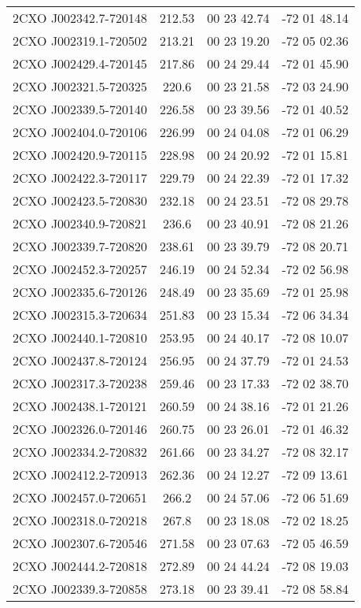 \begin{table}
\begin{tabular}{cccc}
2CXO J002342.7-720148 & 212.53 & 00 23 42.74 & -72 01 48.14 \\
2CXO J002319.1-720502 & 213.21 & 00 23 19.20 & -72 05 02.36 \\
2CXO J002429.4-720145 & 217.86 & 00 24 29.44 & -72 01 45.90 \\
2CXO J002321.5-720325 & 220.6 & 00 23 21.58 & -72 03 24.90 \\
2CXO J002339.5-720140 & 226.58 & 00 23 39.56 & -72 01 40.52 \\
2CXO J002404.0-720106 & 226.99 & 00 24 04.08 & -72 01 06.29 \\
2CXO J002420.9-720115 & 228.98 & 00 24 20.92 & -72 01 15.81 \\
2CXO J002422.3-720117 & 229.79 & 00 24 22.39 & -72 01 17.32 \\
2CXO J002423.5-720830 & 232.18 & 00 24 23.51 & -72 08 29.78 \\
2CXO J002340.9-720821 & 236.6 & 00 23 40.91 & -72 08 21.26 \\
2CXO J002339.7-720820 & 238.61 & 00 23 39.79 & -72 08 20.71 \\
2CXO J002452.3-720257 & 246.19 & 00 24 52.34 & -72 02 56.98 \\
2CXO J002335.6-720126 & 248.49 & 00 23 35.69 & -72 01 25.98 \\
2CXO J002315.3-720634 & 251.83 & 00 23 15.34 & -72 06 34.34 \\
2CXO J002440.1-720810 & 253.95 & 00 24 40.17 & -72 08 10.07 \\
2CXO J002437.8-720124 & 256.95 & 00 24 37.79 & -72 01 24.53 \\
2CXO J002317.3-720238 & 259.46 & 00 23 17.33 & -72 02 38.70 \\
2CXO J002438.1-720121 & 260.59 & 00 24 38.16 & -72 01 21.26 \\
2CXO J002326.0-720146 & 260.75 & 00 23 26.01 & -72 01 46.32 \\
2CXO J002334.2-720832 & 261.66 & 00 23 34.27 & -72 08 32.17 \\
2CXO J002412.2-720913 & 262.36 & 00 24 12.27 & -72 09 13.61 \\
2CXO J002457.0-720651 & 266.2 & 00 24 57.06 & -72 06 51.69 \\
2CXO J002318.0-720218 & 267.8 & 00 23 18.08 & -72 02 18.25 \\
2CXO J002307.6-720546 & 271.58 & 00 23 07.63 & -72 05 46.59 \\
2CXO J002444.2-720818 & 272.89 & 00 24 44.24 & -72 08 19.03 \\
2CXO J002339.3-720858 & 273.18 & 00 23 39.41 & -72 08 58.84 \\

\end{tabular}
\end{table}
